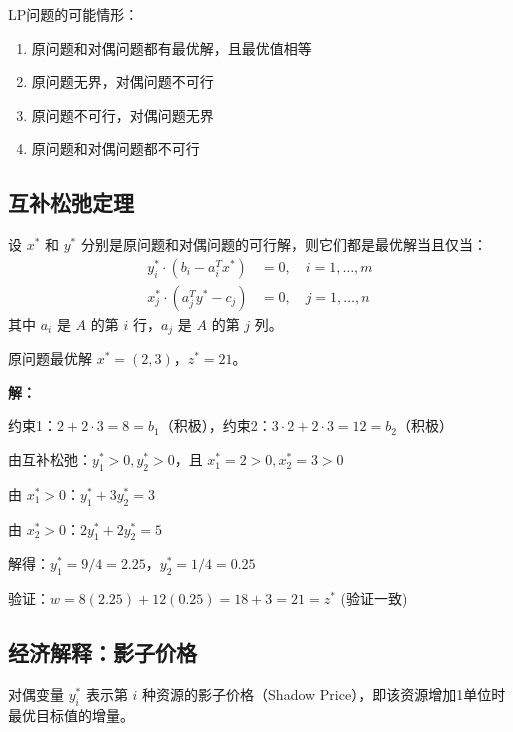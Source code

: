 \begin{corollary}
LP问题的可能情形：
\begin{enumerate}
    \item 原问题和对偶问题都有最优解，且最优值相等
    \item 原问题无界，对偶问题不可行
    \item 原问题不可行，对偶问题无界
    \item 原问题和对偶问题都不可行
\end{enumerate}
\end{corollary}

\subsection{互补松弛定理}

\begin{theorem}[互补松弛条件]
设 $x^*$ 和 $y^*$ 分别是原问题和对偶问题的可行解，则它们都是最优解当且仅当：
\begin{align*}
y_i^* \cdot (b_i - a_i^T x^*) &= 0, \quad i = 1, \ldots, m \\
x_j^* \cdot (a_j^T y^* - c_j) &= 0, \quad j = 1, \ldots, n
\end{align*}
其中 $a_i$ 是 $A$ 的第 $i$ 行，$a_j$ 是 $A$ 的第 $j$ 列。
\end{theorem}

\begin{example}[用互补松弛求对偶最优解]
原问题最优解 $x^* = (2, 3)$，$z^* = 21$。

\textbf{解：}

约束1：$2 + 2 \cdot 3 = 8 = b_1$（积极），约束2：$3 \cdot 2 + 2 \cdot 3 = 12 = b_2$（积极）

由互补松弛：$y_1^* > 0, y_2^* > 0$，且 $x_1^* = 2 > 0, x_2^* = 3 > 0$

由 $x_1^* > 0$：$y_1^* + 3y_2^* = 3$

由 $x_2^* > 0$：$2y_1^* + 2y_2^* = 5$

解得：$y_1^* = 9/4 = 2.25$，$y_2^* = 1/4 = 0.25$

验证：$w = 8(2.25) + 12(0.25) = 18 + 3 = 21 = z^*$ (验证一致)
\end{example}

\subsection{经济解释：影子价格}

\begin{definition}[影子价格]
对偶变量 $y_i^*$ 表示第 $i$ 种资源的影子价格（Shadow Price），即该资源增加1单位时最优目标值的增量。
\end{definition}

